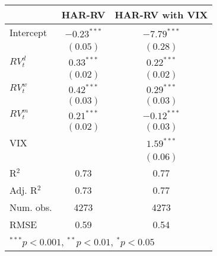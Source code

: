 
\begin{tabular}{l c c }
\hline
 & HAR-RV & HAR-RV with VIX \\
\hline
Intercept    & $-0.23^{***}$ & $-7.79^{***}$ \\
             & $(0.05)$      & $(0.28)$      \\
$RV_{t}^{d}$ & $0.33^{***}$  & $0.22^{***}$  \\
             & $(0.02)$      & $(0.02)$      \\
$RV_{t}^{w}$ & $0.42^{***}$  & $0.29^{***}$  \\
             & $(0.03)$      & $(0.03)$      \\
$RV_{t}^{m}$ & $0.21^{***}$  & $-0.12^{***}$ \\
             & $(0.02)$      & $(0.03)$      \\
VIX          &               & $1.59^{***}$  \\
             &               & $(0.06)$      \\
\hline
R$^2$        & 0.73          & 0.77          \\
Adj. R$^2$   & 0.73          & 0.77          \\
Num. obs.    & 4273          & 4273          \\
RMSE         & 0.59          & 0.54          \\
\hline
\multicolumn{3}{l}{\scriptsize{$^{***}p<0.001$, $^{**}p<0.01$, $^*p<0.05$}}
\end{tabular}
